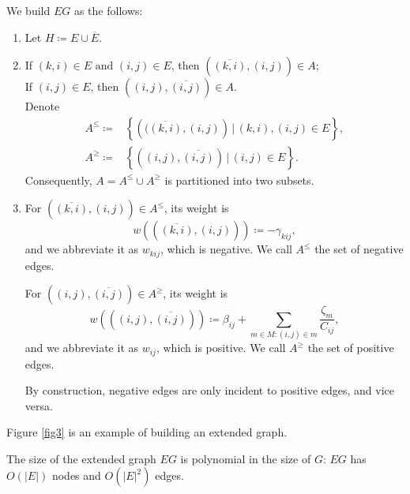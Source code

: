 We build \(EG\) as the follows:
\begin{enumerate}
    \item Let \(H \coloneqq E \cup \overline{E}\).
    \item If \((k,i) \in E \text{ and } (i,j) \in E\), then \(\left (\overline{(k,i)},(i,j)\right) \in A\);\\
    If \( (i,j) \in E\), then \(\left((i,j),\overline{(i,j)}\right) \in A\). \\
    Denote
    \begin{equation}
    \begin{split}
 A^{\le} \coloneqq&  \left \{\left((\overline{(k,i)},(i,j)\right)\,|\, (k,i), (i,j) \in E \right\}, \\
 A^{\ge} \coloneqq& \left \{\left((i,j),\overline{(i,j)}\right)\,|\, (i,j) \in E \right\}.
 \end{split}
 \end{equation}
 Consequently, \(A  =  A^{\le} \cup  A^{\ge} \) is partitioned into two subsets.
 \item For \(\left  (\overline{(k,i)},(i,j)\right) \in A^{\le}\),  its weight is
 \begin{equation}
 w\left( \left  (\overline{(k,i)},(i,j)\right) \right) \coloneqq -\gamma_{kij},
 \end{equation}
 and we abbreviate it as \(w_{kij}\), which is negative. We call \(A^{\le}\) the set of negative edges.
 
 For \(\left((i,j), \overline{(i,j)}\right) \in A^{\ge}\),  its weight is
 \begin{equation}
 w\left(\left((i,j), \overline{(i,j)}\right)\right) \coloneqq \beta_{ij} +  \sum_{m \in M: (i,j) \in m} \frac{\zeta_{m}}{C_{ij}},
 \end{equation}
 and we abbreviate it as \(w_{ij}\), which is positive. We call \(A^{\ge}\) the set of positive edges.
 
 By construction, negative edges are only incident to positive edges, and vice versa.
\end{enumerate}

Figure \eqref{fig3} is an example of building an extended graph.

The size of the extended graph \(EG\) is polynomial in the size of \(G\): \(EG\) has \(O(|E|)\) nodes and \(O(|E|^2)\) edges.


